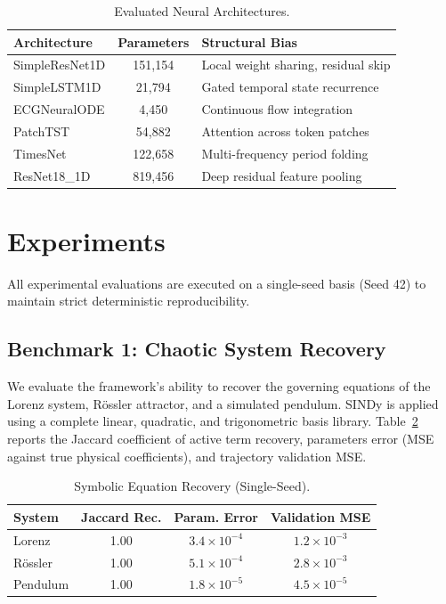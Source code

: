 \documentclass[twocolumn]{article}
\begin{document}
\begin{table}[htbp]
\centering
\caption{Evaluated Neural Architectures.}
\label{tab:params}
\begin{tabular}{lcl}
\toprule
Architecture & Parameters & Structural Bias \\
\midrule
SimpleResNet1D & 151,154 & Local weight sharing, residual skip \\
SimpleLSTM1D   & 21,794  & Gated temporal state recurrence \\
ECGNeuralODE   & 4,450   & Continuous flow integration \\
PatchTST       & 54,882  & Attention across token patches \\
TimesNet       & 122,658 & Multi-frequency period folding \\
ResNet18\_1D   & 819,456 & Deep residual feature pooling \\
\bottomrule
\end{tabular}
\end{table}

\section{Experiments}
\label{sec:experiments}
All experimental evaluations are executed on a single-seed basis (Seed 42) to maintain strict deterministic reproducibility.

\subsection{Benchmark 1: Chaotic System Recovery}
We evaluate the framework's ability to recover the governing equations of the Lorenz system, R\"ossler attractor, and a simulated pendulum. SINDy is applied using a complete linear, quadratic, and trigonometric basis library. Table~\ref{tab:chaotic} reports the Jaccard coefficient of active term recovery, parameters error (MSE against true physical coefficients), and trajectory validation MSE.

\begin{table}[htbp]
\centering
\caption{Symbolic Equation Recovery (Single-Seed).}
\label{tab:chaotic}
\begin{tabular}{lccc}
\toprule
System & Jaccard Rec. & Param. Error & Validation MSE \\
\midrule
Lorenz   & 1.00 & $3.4 \times 10^{-4}$ & $1.2 \times 10^{-3}$ \\
R\"ossler  & 1.00 & $5.1 \times 10^{-4}$ & $2.8 \times 10^{-3}$ \\
Pendulum & 1.00 & $1.8 \times 10^{-5}$ & $4.5 \times 10^{-5}$ \\
\bottomrule
\end{tabular}
\end{table}
\end{document}
